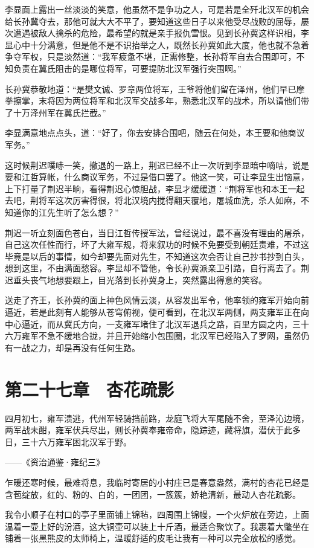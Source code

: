 李显面上露出一丝淡淡的笑意，他虽然不是争功之人，可是若是全歼北汉军的机会给长孙冀夺去，那他可就大大不平了，要知道这些日子以来他受尽战败的屈辱，屡次遭遇被敌人擒杀的危险，最希望的就是亲手报仇雪恨。见到长孙冀这样识相，李显心中十分满意，但是他不是不识抬举之人，既然长孙冀如此大度，他也就不急着争夺军权，只是淡然道：“我军疲惫不堪，正需修整，长孙将军自去合围即可，不知负责在冀氏阻击的是哪位将军，可要提防北汉军强行突围啊。”

长孙冀恭敬地道：“是樊文诚、罗章两位将军，王爷将他们留在泽州，他们早已摩拳擦掌，末将因为两位将军和北汉军交战多年，熟悉北汉军的战术，所以请他们带了十万泽州军在冀氏拦截。”

李显满意地点点头，道：“好了，你去安排合围吧，随云在何处，本王要和他商议军务。”

这时候荆迟噗哧一笑，撤退的一路上，荆迟已经不止一次听到李显暗中嘀咕，说是要和江哲算帐，什么商议军务，不过是借口罢了。他这一笑，可让李显生出恼意，上下打量了荆迟半晌，看得荆迟心惊胆战，李显才缓缓道：“荆将军也和本王一起去吧，荆将军这次厉害得很，将北汉境内搅得翻天覆地，屠城血洗，杀人如麻，不知道你的江先生听了怎么想？”

荆迟一听立刻面色苍白，当日江哲传授军法，曾经说过，最不喜没有理由的屠杀，自己这次任性而行，坏了大雍军规，将来叙功的时候不免要受到朝廷责难，不过这毕竟是以后的事情，如今却要先面对先生，不知道这次会否让自己抄书抄到白头，想到这里，不由满面愁容。李显却不管他，令长孙冀派亲卫引路，自行离去了。荆迟垂头丧气地想要跟上，目光落到长孙冀身上，突然露出得意的笑容。

送走了齐王，长孙冀的面上神色风情云淡，从容发出军令，他率领的雍军开始向前逼近，若是此刻有人能够从苍穹俯视，便可看到，在北汉军两侧，两支雍军正在向中心逼近，而从冀氏方向，一支雍军堵住了北汉军退兵之路，百里方圆之内，三十六万雍军不急不缓地合拢，并且开始缩小包围圈，北汉军已经陷入了罗网，虽然仍有一战之力，却是再没有任何生路。

\chapter{第二十七章　杏花疏影}

四月初七，雍军溃逃，代州军轻骑挡前路，龙庭飞将大军尾随不舍，至泽沁边境，两军战未酣，雍军伏兵尽出，则长孙冀奉雍帝命，隐踪迹，藏将旗，潜伏于此多日，三十六万雍军困北汉军于野。

——《资治通鉴·雍纪三》

乍暖还寒时候，最难将息，我临时寄居的小村庄已是春意盎然，满村的杏花已经是含苞绽放，红的、粉的、白的，一团团，一簇簇，娇艳清新，最动人杏花疏影。

我令小顺子在村口的亭子里面铺上锦毡，四周围上锦幔，一个火炉放在旁边，上面温着一壶上好的汾酒，这大铜壶可以装上十斤酒，最适合聚饮了。我裹着大氅坐在铺着一张黑熊皮的太师椅上，温暖舒适的皮毛让我有一种可以完全放松的感觉。

